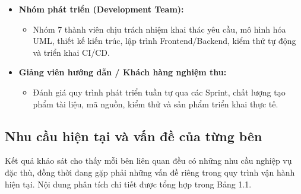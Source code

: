 \documentclass[12pt,a4paper]{report}
\begin{document}
\begin{itemize}[leftmargin=*]
\item \textbf{Nhóm phát triển (Development Team):}
  \begin{itemize}[nosep]
  \item Nhóm 7 thành viên chịu trách nhiệm khai thác yêu cầu, mô hình hóa UML, thiết kế kiến trúc, lập trình Frontend/Backend, kiểm thử tự động và triển khai CI/CD.
  \end{itemize}

\item \textbf{Giảng viên hướng dẫn / Khách hàng nghiệm thu:}
  \begin{itemize}[nosep]
  \item Đánh giá quy trình phát triển tuần tự qua các Sprint, chất lượng tạo phẩm tài liệu, mã nguồn, kiểm thử và sản phẩm triển khai thực tế.
  \end{itemize}
\end{itemize}

\subsection{Nhu cầu hiện tại và vấn đề của từng bên}

Kết quả khảo sát cho thấy mỗi bên liên quan đều có những nhu cầu nghiệp vụ đặc thù, đồng thời đang gặp phải những vấn đề riêng trong quy trình vận hành hiện tại. Nội dung phân tích chi tiết được tổng hợp trong Bảng 1.1.
\end{document}
